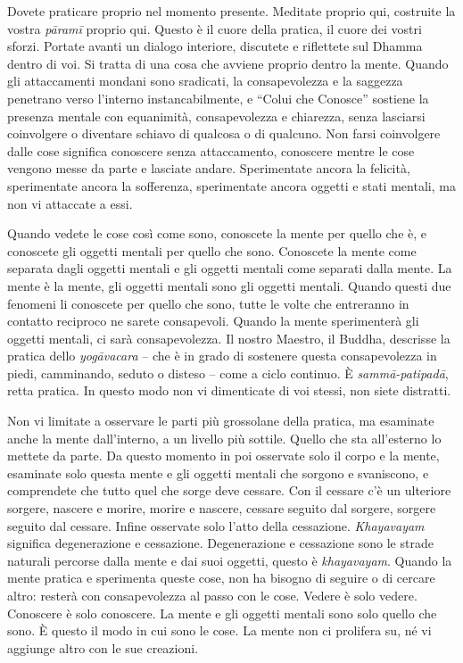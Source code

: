Dovete praticare proprio nel momento presente. Meditate proprio qui,
costruite la vostra \emph{pāramī} proprio qui. Questo è il cuore della
pratica, il cuore dei vostri sforzi. Portate avanti un dialogo
interiore, discutete e riflettete sul Dhamma dentro di voi. Si tratta di
una cosa che avviene proprio dentro la mente. Quando gli attaccamenti
mondani sono sradicati, la consapevolezza e la saggezza penetrano verso
l'interno instancabilmente, e ``Colui che Conosce'' sostiene la presenza
mentale con equanimità, consapevolezza e chiarezza, senza lasciarsi
coinvolgere o diventare schiavo di qualcosa o di qualcuno. Non farsi
coinvolgere dalle cose significa conoscere senza attaccamento, conoscere
mentre le cose vengono messe da parte e lasciate andare. Sperimentate
ancora la felicità, sperimentate ancora la sofferenza, sperimentate
ancora oggetti e stati mentali, ma non vi attaccate a essi.

Quando vedete le cose così come sono, conoscete la mente per quello che
è, e conoscete gli oggetti mentali per quello che sono. Conoscete la
mente come separata dagli oggetti mentali e gli oggetti mentali come
separati dalla mente. La mente è la mente, gli oggetti mentali sono gli
oggetti mentali. Quando questi due fenomeni li conoscete per quello che
sono, tutte le volte che entreranno in contatto reciproco ne sarete
consapevoli. Quando la mente sperimenterà gli oggetti mentali, ci sarà
consapevolezza. Il nostro Maestro, il Buddha, descrisse la pratica dello
\emph{yogāvacara} -- che è in grado di sostenere questa consapevolezza
in piedi, camminando, seduto o disteso -- come a ciclo continuo. È
\emph{sammā-patipadā}, retta pratica. In questo modo non vi dimenticate
di voi stessi, non siete distratti.

Non vi limitate a osservare le parti più grossolane della pratica, ma
esaminate anche la mente dall'interno, a un livello più sottile. Quello
che sta all'esterno lo mettete da parte. Da questo momento in poi
osservate solo il corpo e la mente, esaminate solo questa mente e gli
oggetti mentali che sorgono e svaniscono, e comprendete che tutto quel
che sorge deve cessare. Con il cessare c'è un ulteriore sorgere, nascere
e morire, morire e nascere, cessare seguito dal sorgere, sorgere seguito
dal cessare. Infine osservate solo l'atto della cessazione.
\emph{Khayavayam} significa degenerazione e cessazione. Degenerazione e
cessazione sono le strade naturali percorse dalla mente e dai suoi
oggetti, questo è \emph{khayavayam}. Quando la mente pratica e
sperimenta queste cose, non ha bisogno di seguire o di cercare altro:
resterà con consapevolezza al passo con le cose. Vedere è solo vedere.
Conoscere è solo conoscere. La mente e gli oggetti mentali sono solo
quello che sono. È questo il modo in cui sono le cose. La mente non ci
prolifera su, né vi aggiunge altro con le sue creazioni.

